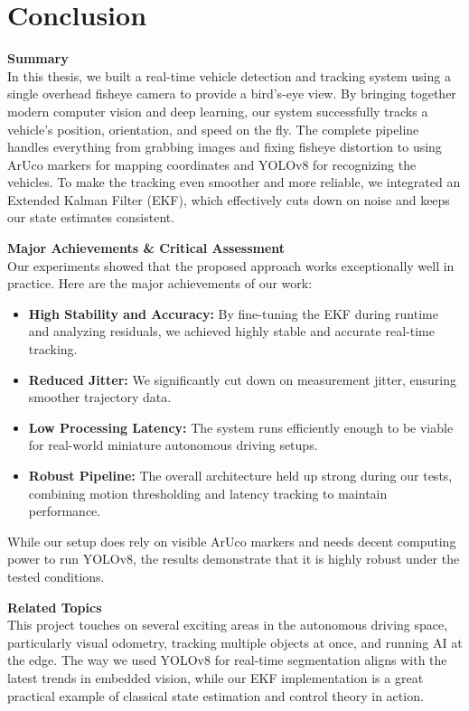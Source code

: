 \chapter{Conclusion}
\label{ch:conclusion}

\textbf{Summary}\\
In this thesis, we built a real-time vehicle detection and tracking system using a single overhead fisheye camera to provide a bird's-eye view. By bringing together modern computer vision and deep learning, our system successfully tracks a vehicle's position, orientation, and speed on the fly. The complete pipeline handles everything from grabbing images and fixing fisheye distortion to using ArUco markers for mapping coordinates and YOLOv8 for recognizing the vehicles. To make the tracking even smoother and more reliable, we integrated an Extended Kalman Filter (EKF), which effectively cuts down on noise and keeps our state estimates consistent.

\textbf{Major Achievements \& Critical Assessment}\\
\label{sec:achievements}
Our experiments showed that the proposed approach works exceptionally well in practice. Here are the major achievements of our work:
\begin{itemize}
	\item \textbf{High Stability and Accuracy:} By fine-tuning the EKF during runtime and analyzing residuals, we achieved highly stable and accurate real-time tracking.
	\item \textbf{Reduced Jitter:} We significantly cut down on measurement jitter, ensuring smoother trajectory data.
	\item \textbf{Low Processing Latency:} The system runs efficiently enough to be viable for real-world miniature autonomous driving setups.
	\item \textbf{Robust Pipeline:} The overall architecture held up strong during our tests, combining motion thresholding and latency tracking to maintain performance.
\end{itemize}
While our setup does rely on visible ArUco markers and needs decent computing power to run YOLOv8, the results demonstrate that it is highly robust under the tested conditions.

\textbf{Related Topics}\\
This project touches on several exciting areas in the autonomous driving space, particularly visual odometry, tracking multiple objects at once, and running AI at the edge. The way we used YOLOv8 for real-time segmentation aligns with the latest trends in embedded vision, while our EKF implementation is a great practical example of classical state estimation and control theory in action.
